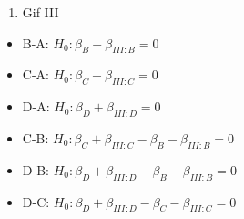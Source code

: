\documentclass[
  dutch,
  letterpaper,
  12pt]{book}
\providecommand{\tightlist}{%
  \setlength{\itemsep}{0pt}\setlength{\parskip}{0pt}}
\theoremstyle{definition}
\theoremstyle{definition}
\theoremstyle{definition}
\theoremstyle{remark}
\begin{document}
\begin{enumerate}
\def\labelenumi{\arabic{enumi}.}
\setcounter{enumi}{2}
\tightlist
\item
  Gif III
\end{enumerate}

\begin{itemize}
\tightlist
\item
  B-A: \(H_0: \beta_{B}+\beta_{III:B}=0\)
\item
  C-A: \(H_0: \beta_{C}+\beta_{III:C}=0\)
\item
  D-A: \(H_0: \beta_{D}+\beta_{III:D}=0\)
\item
  C-B: \(H_0: \beta_{C}+\beta_{III:C}-\beta_{B}-\beta_{III:B}=0\)
\item
  D-B: \(H_0: \beta_{D}+\beta_{III:D}-\beta_{B}-\beta_{III:B}=0\)
\item
  D-C: \(H_0: \beta_{D}+\beta_{III:D}-\beta_{C}-\beta_{III:C}=0\)
\end{itemize}
\end{document}
